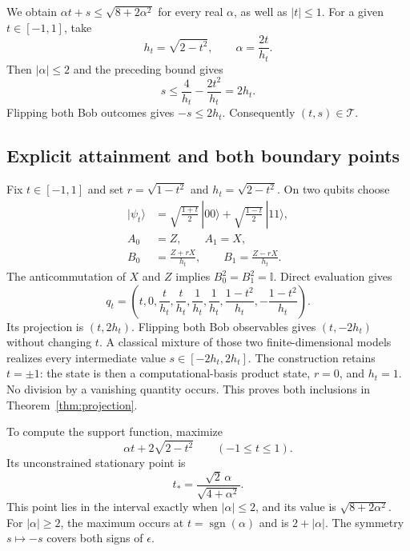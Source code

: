 \documentclass[11pt]{article}
\newcommand{\T}{\mathcal T}
\newcommand{\Id}{\mathbb I}
\begin{document}
We obtain $\alpha t+s\le\sqrt{8+2\alpha^2}$ for every real $\alpha$, as well as $|t|\le1$. For a given $t\in[-1,1]$, take
\[
 h_t=\sqrt{2-t^2},\qquad \alpha=\frac{2t}{h_t}.
\]
Then $|\alpha|\le2$ and the preceding bound gives
\[
 s\le\frac4{h_t}-\frac{2t^2}{h_t}=2h_t.
\]
Flipping both Bob outcomes gives $-s\le2h_t$. Consequently $(t,s)\in\T$.

\subsection{Explicit attainment and both boundary points}
Fix $t\in[-1,1]$ and set $r=\sqrt{1-t^2}$ and $h_t=\sqrt{2-t^2}$. On two qubits choose
\begin{align*}
 |\psi_t\rangle&=\sqrt{\frac{1+t}{2}}\,|00\rangle
                    +\sqrt{\frac{1-t}{2}}\,|11\rangle,\\
 A_0&=Z,\qquad A_1=X,\\
 B_0&=\frac{Z+rX}{h_t},\qquad B_1=\frac{Z-rX}{h_t}.
\end{align*}
The anticommutation of $X$ and $Z$ implies $B_0^2=B_1^2=\Id$. Direct evaluation gives
\begin{equation}\label{eq:attainment}
 q_t=\left(t,0,\frac{t}{h_t},\frac{t}{h_t},
           \frac1{h_t},\frac1{h_t},
           \frac{1-t^2}{h_t},-\frac{1-t^2}{h_t}\right).
\end{equation}
Its projection is $(t,2h_t)$. Flipping both Bob observables gives $(t,-2h_t)$ without changing $t$. A classical mixture of those two finite-dimensional models realizes every intermediate value $s\in[-2h_t,2h_t]$. The construction retains $t=\pm1$: the state is then a computational-basis product state, $r=0$, and $h_t=1$. No division by a vanishing quantity occurs. This proves both inclusions in Theorem~\ref{thm:projection}.

To compute the support function, maximize
\[
 \alpha t+2\sqrt{2-t^2}\qquad(-1\le t\le1).
\]
Its unconstrained stationary point is
\[
 t_* =\frac{\sqrt2\,\alpha}{\sqrt{4+\alpha^2}}.
\]
This point lies in the interval exactly when $|\alpha|\le2$, and its value is $\sqrt{8+2\alpha^2}$. For $|\alpha|\ge2$, the maximum occurs at $t=\operatorname{sgn}(\alpha)$ and is $2+|\alpha|$. The symmetry $s\mapsto-s$ covers both signs of $\epsilon$.
\end{document}
